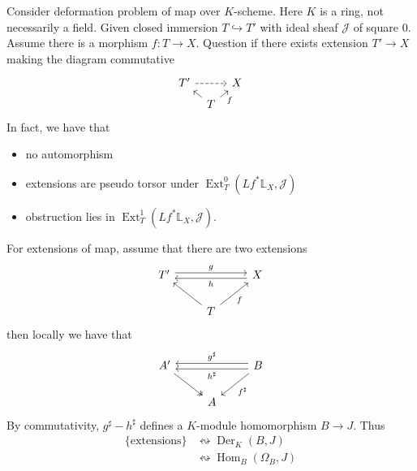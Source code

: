 \documentclass{ctexart}
\renewcommand{\hom}{\operatorname{Hom}}
\newcommand{\derivation}{\operatorname{Der}}
\newcommand{\ext}{\operatorname{Ext}}
\begin{document}
Consider deformation problem of map over $K$-scheme.
Here $K$ is a ring, not necessarily a field.
Given closed immersion $T \hookrightarrow T'$ with ideal sheaf $\mathcal{J}$ of square $0$.
Assume there is a morphism $f: T \rightarrow X$.
Question if there exists extension $T' \rightarrow X$ making the diagram commutative
\begin{equation}
    \begin{tikzcd}[sep = tiny]
        T' \arrow[rr, dashrightarrow] &&
        X \\
        & T \arrow[ul] \arrow[ur, "f" swap] &
    \end{tikzcd}
\end{equation}
In fact, we have that
\begin{itemize}
    \item no automorphism 
    \item extensions are pseudo torsor under $\ext_{T}^{0}(Lf^{\ast}\mathbb{L}_{X}, \mathcal{J})$ 
    \item obstruction lies in $\ext_{T}^{1}(Lf^{\ast}\mathbb{L}_{X}, \mathcal{J})$.
\end{itemize}
For extensions of map, assume that there are two extensions
\begin{equation}
    \begin{tikzcd}
        T' \arrow[rr, "g", shift left] \arrow[rr, leftarrow, "h" swap, shift right] &&
        X \\
        & T \arrow[ul] \arrow[ur, "f" swap] &
    \end{tikzcd}
\end{equation}
then locally we have that
\begin{equation}
    \begin{tikzcd}
        A' \arrow[dr, twoheadrightarrow] &&
        B \arrow[dl, "f^{\sharp}"] \arrow[ll, "g^{\sharp}" swap, shift right] \arrow[ll, "h^{\sharp}", shift left] \\
        & A &
    \end{tikzcd}
\end{equation}
By commutativity, $g^{\sharp} - h^{\sharp}$ defines a $K$-module homomorphism $B \rightarrow J$.
Thus
\begin{equation}
    \begin{split}
        \{\text{extensions}\} & \leftrightsquigarrow \derivation_{K}(B, J) \\
        & \leftrightsquigarrow \hom_{B}(\Omega_{B}, J)
    \end{split}
\end{equation}
\end{document}
